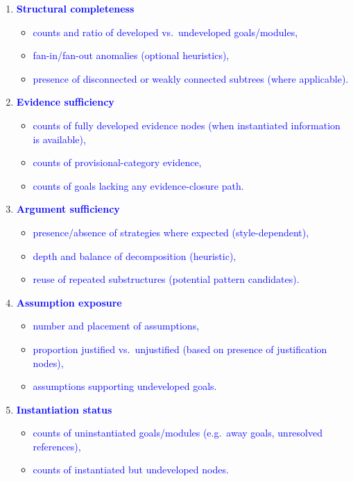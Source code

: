 \documentclass[11pt]{article}
\begin{document}
\begin{enumerate}[leftmargin=2em]
  \item \textcolor{blue}{\textbf{Structural completeness}}
  \begin{itemize}[leftmargin=1.5em]
    \item \textcolor{blue}{counts and ratio of developed vs.\ undeveloped goals/modules,}
    \item \textcolor{blue}{fan-in/fan-out anomalies (optional heuristics),}
    \item \textcolor{blue}{presence of disconnected or weakly connected subtrees (where applicable).}
  \end{itemize}

  \item \textcolor{blue}{\textbf{Evidence sufficiency}}
  \begin{itemize}[leftmargin=1.5em]
    \item \textcolor{blue}{counts of fully developed evidence nodes (when instantiated information is available),}
    \item \textcolor{blue}{counts of provisional-category evidence,}
    \item \textcolor{blue}{counts of goals lacking any evidence-closure path.}
  \end{itemize}

  \item \textcolor{blue}{\textbf{Argument sufficiency}}
  \begin{itemize}[leftmargin=1.5em]
    \item \textcolor{blue}{presence/absence of strategies where expected (style-dependent),}
    \item \textcolor{blue}{depth and balance of decomposition (heuristic),}
    \item \textcolor{blue}{reuse of repeated substructures (potential pattern candidates).}
  \end{itemize}

  \item \textcolor{blue}{\textbf{Assumption exposure}}
  \begin{itemize}[leftmargin=1.5em]
    \item \textcolor{blue}{number and placement of assumptions,}
    \item \textcolor{blue}{proportion justified vs.\ unjustified (based on presence of justification nodes),}
    \item \textcolor{blue}{assumptions supporting undeveloped goals.}
  \end{itemize}

  \item \textcolor{blue}{\textbf{Instantiation status}}
  \begin{itemize}[leftmargin=1.5em]
    \item \textcolor{blue}{counts of uninstantiated goals/modules (e.g.\ away goals, unresolved references),}
    \item \textcolor{blue}{counts of instantiated but undeveloped nodes.}
  \end{itemize}
\end{enumerate}
\end{document}
